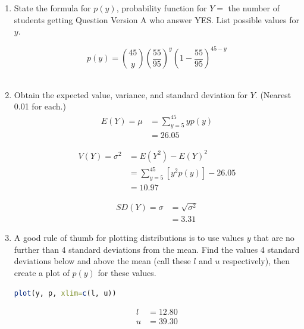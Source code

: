 \documentclass{scrartcl}
\begin{document}
\begin{enumerate}

\item State the formula for $p(y)$, probability function for $Y = $ the number of students getting Question Version A who answer YES. List possible values for $y$.

$$p(y) = {45 \choose y}\left(\frac{55}{95}\right)^y\left(1-\frac{55}{95}\right)^{45-y}$$\\

\item Obtain the expected value, variance, and standard deviation for $Y$. (Nearest 0.01 for each.)\\

\begin{align*}
  E(Y) = \mu &= \sum_{y=5}^{45}yp(y)\\
  &= 26.05
\end{align*}

\begin{align*}
  V(Y) = \sigma^2 &= E(Y^2) - E(Y)^2\\
  &= \sum_{y=5}^{45}\left[y^2p(y)\right] - 26.05\\
  &= 10.97
\end{align*}

\begin{align*}
  SD(Y) = \sigma &= \sqrt{\sigma^2}\\
  &= 3.31
\end{align*}
\pagebreak

\item A good rule of thumb for plotting distributions is to use values $y$ that are no further than 4 standard deviations from the mean. Find the values 4 standard deviations below and above the mean (call these $l$ and $u$ respectively), then create a plot of $p(y)$ for these values.

\begin{lstlisting}[language=R]
  plot(y, p, xlim=c(l, u))
\end{lstlisting}

\begin{align*}
  l &= 12.80\\
  u &= 39.30
\end{align*}


\end{enumerate}
\end{document}
